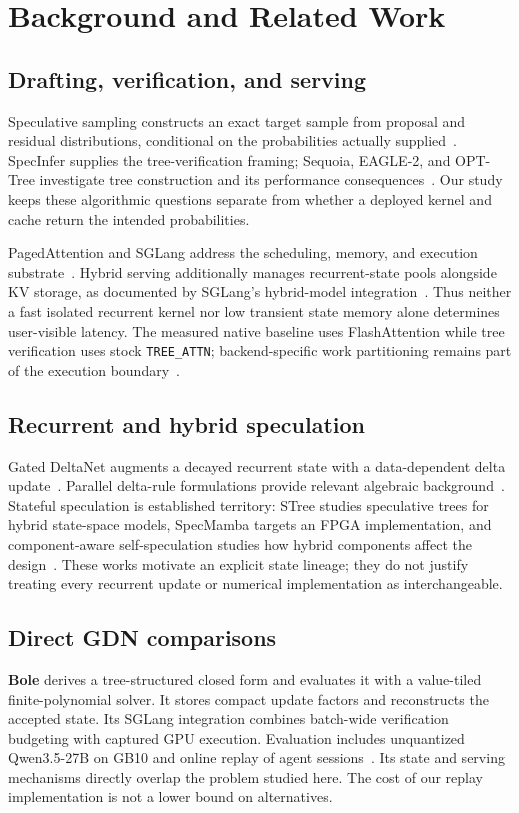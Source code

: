 \documentclass[conference]{IEEEtran}
\begin{document}
\section{Background and Related Work}
\label{sec:related}
\subsection{Drafting, verification, and serving}
Speculative sampling constructs an exact target sample from proposal and residual distributions, conditional on the probabilities actually supplied~\cite{leviathan2023fast,chen2023sampling}. SpecInfer supplies the tree-verification framing; Sequoia, EAGLE-2, and OPT-Tree investigate tree construction and its performance consequences~\cite{miao2023specinfer,chen2024sequoia,li2024eagle,wang2024opt}. Our study keeps these algorithmic questions separate from whether a deployed kernel and cache return the intended probabilities.

PagedAttention and SGLang address the scheduling, memory, and execution substrate~\cite{kwon2023efficient,zheng2024sglang}. Hybrid serving additionally manages recurrent-state pools alongside KV storage, as documented by SGLang's hybrid-model integration~\cite{pytorch2025sglang,sglang2026qwen}. Thus neither a fast isolated recurrent kernel nor low transient state memory alone determines user-visible latency. The measured native baseline uses FlashAttention while tree verification uses stock \texttt{TREE\_ATTN}; backend-specific work partitioning remains part of the execution boundary~\cite{dao2023flashattention,lumo2026archive}.

\subsection{Recurrent and hybrid speculation}
Gated DeltaNet augments a decayed recurrent state with a data-dependent delta update~\cite{yang2024gated}. Parallel delta-rule formulations provide relevant algebraic background~\cite{yang2024delta}. Stateful speculation is established territory: STree studies speculative trees for hybrid state-space models, SpecMamba targets an FPGA implementation, and component-aware self-speculation studies how hybrid components affect the design~\cite{wu2025stree,zhong2025specmamba,borobia2026component}. These works motivate an explicit state lineage; they do not justify treating every recurrent update or numerical implementation as interchangeable.

\subsection{Direct GDN comparisons}
\textbf{Bole} derives a tree-structured closed form and evaluates it with a value-tiled finite-polynomial solver. It stores compact update factors and reconstructs the accepted state. Its SGLang integration combines batch-wide verification budgeting with captured GPU execution. Evaluation includes unquantized Qwen3.5-27B on GB10 and online replay of agent sessions~\cite{wang2026bole}. Its state and serving mechanisms directly overlap the problem studied here. The cost of our replay implementation is not a lower bound on alternatives.
\end{document}
